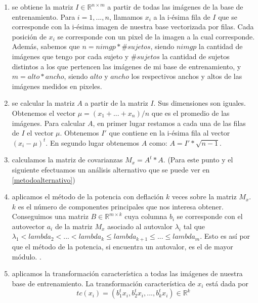 \begin{enumerate}
 \item se obtiene la matriz $I\in\mathbb{R}^{n \times m}$ a partir de todas las imágenes de la base de entrenamiento. Para $i = 1,...,n$, llamamos $x_i$ a
 la i-ésima fila de $I$ que se corresponde con la i-ésima imagen de nuestra base vectorizada por filas. Cada posición de $x_i$ se 
 corresponde con un pixel de la imagen a la cual corresponde. Además, sabemos que $n = nimgp * \#sujetos$, siendo $nimgp$ la cantidad de imágenes
 que tengo por cada sujeto y $\#sujetos$ la cantidad de sujetos distintos a los que pertencen las imágenes de mi base de entrenamiento, y 
 $m = alto * ancho$, siendo $alto$ y $ancho$ los respectivos anchos y altos de las imágenes medidos en pixeles.
 
 \item se calcular la matriz $A$ a partir de la matriz $I$. Sus dimensiones son iguales. Obtenemos el vector $\mu = (x_1+...+x_n)/n$ que es 
 el promedio de las imágenes. Para calcular $A$, en primer lugar restamos a cada una de las filas de $I$ el vector $\mu$. Obtenemos $I'$ que contiene en la
 i-ésima fila al vector $(x_i - \mu)^t$. En segundo lugar obtenemos $A$ como: $A = I' * \sqrt{n-1}$.
 
 \item calculamos la matriz de covarianzas $M_x = A^t*A$. (Para este punto y el siguiente efectuamos un análisis alternativo que se puede ver en \ref{metodoalternativo})
 
 \item aplicamos el método de la potencia con deflación $k$ veces sobre la matriz $M_x$. $k$ es el número de componentes principales que nos 
 interesa obtener. Conseguimos una matriz $B\in\mathbb{R}^{m \times k}$ cuya columna $b_i$ se corresponde con el autovector $a_i$ de la matriz
 $M_x$ asociado al autovalor $\lambda_i$ tal que $\lambda_1 < lambda_2 < ... < lambda_k \leq lambda_{k+1} \leq ... \leq lambda_m$. Esto es así
 por que el método de la potencia, si encuentra un autovalor, es el de mayor módulo. \cite[1]{burden}.
 
 \item aplicamos la transformación característica a todas las imágenes de nuestra base de entrenamiento. La transformación característica
 de $x_i$ está dada por \begin{displaymath}
			    tc(x_i) = ({b_1^t}x_i, {b_2^t}x_i,..., {b_k^t}x_i)\in\mathbb{R}^k
                        \end{displaymath}

\end{enumerate}


